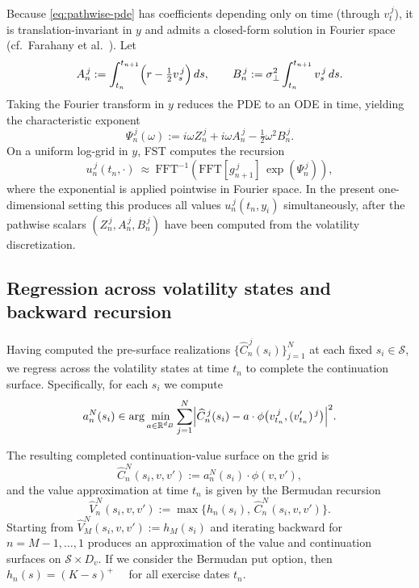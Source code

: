 \documentclass[10pt]{article}
\theoremstyle{plain}
\theoremstyle{definition}
\theoremstyle{remark}
\begin{document}
Because \eqref{eq:pathwise-pde} has coefficients depending only on time (through $v_t^{\,j}$), it is translation-invariant in $y$ and admits
a closed-form solution in Fourier space (cf.\ Farahany et al.~\cite{farahany2020mixing}). Let
\[
A_n^{\,j}:=\int_{t_n}^{t_{n+1}}\Bigl(r-\tfrac12 v_s^{\,j}\Bigr)\,ds,
\qquad
B_n^{\,j}:=\sigma_\perp^2\int_{t_n}^{t_{n+1}} v_s^{\,j}\,ds.
\]
Taking the Fourier transform in $y$ reduces the PDE to an ODE in time, yielding the characteristic exponent
\[
\Psi_n^{\,j}(\omega)
:= i\omega Z_n^{\,j} + i\omega A_n^{\,j} - \tfrac12 \omega^2 B_n^{\,j}.
\]
On a uniform log-grid in $y$, FST computes the recursion
\begin{equation}
u_n^{\,j}(t_n,\cdot)\ \approx\ \mathrm{FFT}^{-1}\!\left(\mathrm{FFT}[g_{n+1}^{\,j}]\,\exp(\Psi_n^{\,j})\right),
\label{eq:fst-recursion}
\end{equation}
where the exponential is applied pointwise in Fourier space. In the present one-dimensional setting this produces all values
$u_n^{\,j}(t_n,y_i)$ simultaneously, after the pathwise scalars
$(Z_n^{\,j},A_n^{\,j},B_n^{\,j})$ have been computed from the volatility discretization.

\subsection{Regression across volatility states and backward recursion}
Having computed the pre-surface realizations $\{\widehat C_n^{\,j}(s_i)\}_{j=1}^N$ at each fixed $s_i\in\mathcal S$, we regress across the
volatility states at time $t_n$ to complete the continuation surface. Specifically, for each $s_i$ we compute
\begin{equation}
a_n^{N}(s_i)\in \arg\min_{a\in\mathbb R^{d_B}}
\sum_{j=1}^N \Bigl|\widehat C_n^{\,j}(s_i) - a\cdot \phi\bigl(v_{t_n}^{\,j},(v_{t_n}')^{\,j}\bigr)\Bigr|^2.
\label{eq:lsq}
\end{equation}


The resulting completed continuation-value surface on the grid is
\[
\widehat C_n^{N}(s_i,v,v') := a_n^{N}(s_i)\cdot \phi(v,v'),
\]
and the value approximation at time $t_n$ is given by the Bermudan recursion
\[
\widehat V_n^{N}(s_i,v,v') := \max\{h_n(s_i),\,\widehat C_n^{N}(s_i,v,v')\}.
\]
Starting from $\widehat V_M^{N}(s_i,v,v'):=h_M(s_i)$ and iterating backward for $n=M-1,\dots,1$ produces an approximation of the value and
continuation surfaces on $\mathcal S\times D_v$. If we consider the Bermudan put option, then $h_n(s)=(K-s)^{+} \quad$ for all exercise dates $t_n$.
\end{document}
